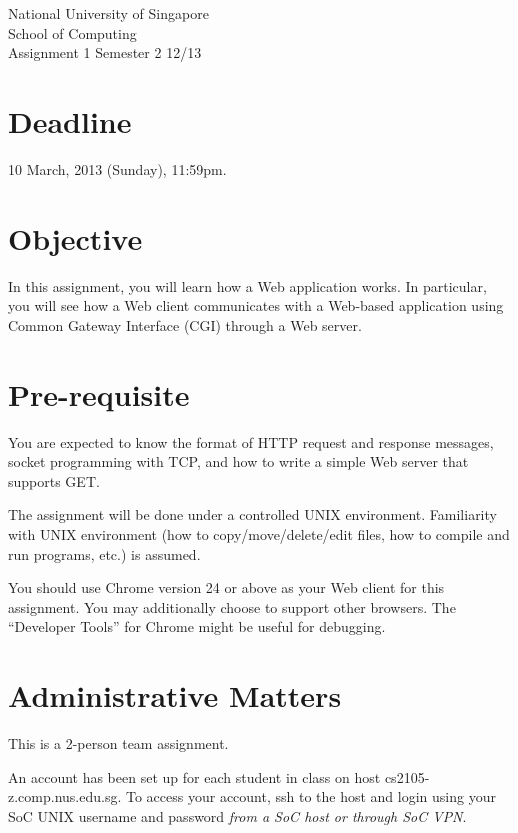 \documentclass[a4paper,11pt]{exam}
\begin{document}
    \extraheadheight{.5in}
    {\large\sf National University of Singapore\\ School of Computing \\
    \LARGE\sf Assignment 1}%
    {\large\sf Semester 2 12/13}
    \firstpageheadrule
    \pagestyle{headandfoot}

    \section*{Deadline}

    10 March, 2013 (Sunday), 11:59pm.

    \section*{Objective}

    In this assignment, you will learn how a Web application works. In particular, you will see how a Web client communicates with a Web-based application using Common Gateway Interface (CGI) through a Web server.

    \section*{Pre-requisite}

You are expected to know the format of HTTP request and response messages, socket programming with TCP, and how to write a simple Web server that supports GET. 

    The assignment will be done under a controlled UNIX environment. Familiarity with UNIX environment (how to copy/move/delete/edit files, how to compile and run programs, etc.) is assumed.

    You should use Chrome version 24 or above as your Web client for this assignment.  You may additionally choose to support other browsers.  The ``Developer Tools'' for Chrome might be useful for debugging.

    \section*{Administrative Matters}

This is a 2-person team assignment.  

An account has been set up for each student in class on host cs2105-z.comp.nus.edu.sg. To access your account, ssh to the host and login using your SoC UNIX username and password \textit{from a SoC host or through SoC VPN}.
\end{document}

